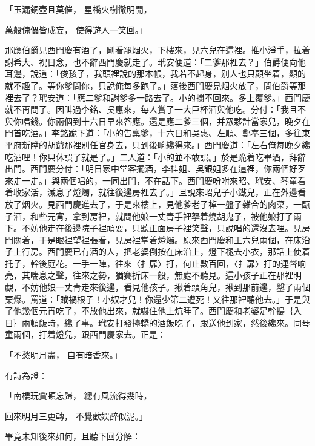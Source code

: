 「玉漏銅壺且莫催，  星橋火樹徹明開，

萬般傀儡皆成妄，  使得遊人一笑回。」

那應伯爵見西門慶有酒了，剛看罷烟火，下樓來，見六兒在這裡。推小淨手，拉着謝希大、祝日念，也不辭西門慶就走了。玳安便道：「二爹那裡去？」伯爵便向他耳邊，說道：「俊孩子，我頭裡說的那本帳，我若不起身，別人也只顧坐着，顯的就不趣了。等你爹問你，只說俺每多跑了。」落後西門慶見烟火放了，問伯爵等那裡去了？玳安道：「應二爹和謝爹多一路去了。小的攔不回來。多上覆爹。」西門慶就不再問了。因叫過李銘、吳惠來，每人賞了一大巨杯酒與他吃。分付：「我且不與你唱錢。你兩個到十六日早來答應。還是應二爹三個，并眾夥計當家兒，晚夕在門首吃酒。」李銘跪下道：「小的告稟爹，十六日和吳惠、左順、鄭奉三個，多往東平府新陞的胡爺那裡別任官身去，只到後晌纔得來。」西門慶道：「左右俺每晚夕纔吃酒哩！你只休誤了就是了。」二人道：「小的並不敢誤。」於是跪着吃畢酒，拜辭出門。西門慶分付：「明日家中堂客擺酒，李桂姐、吳銀姐多在這裡，你兩個好歹來走一走。」與兩個唱的，一同出門，不在話下。西門慶吩咐來昭、玳安、琴童看着收家活，滅息了燈燭，就往後邊房裡去了。」且說來昭兒子小鐵兒，正在外邊看放了烟火。見西門慶進去了，于是來樓上，見他爹老子棹一盤子雜合的肉菜，一甌子酒，和些元宵，拿到房裡，就問他娘一丈青手裡拏着燒胡鬼子，被他娘打了兩下。不妨他走在後邊院子裡頑耍，只聽正面房子裡笑聲，只說唱的還沒去哩。見房門關着，于是眼裡望裡張看，見房裡掌着燈燭。原來西門慶和王六兒兩個，在床沿子上行房。西門慶已有酒的人，把老婆倒按在床沿上，燈下褪去小衣，那話上使着托子，幹後庭花。一手一陣，往來〈扌扉〉打，何止數百回，〈扌扉〉打的連聲响亮，其喘息之聲，往來之勢，猶賽折床一般，無處不聽見。這小孩子正在那裡明覷，不妨他娘一丈青走來後邊，看見他孩子。揪着頭角兒，揪到那前邊，鑿了兩個栗爆。罵道：「賊禍根子！小奴才兒！你還少第二遭死！又往那裡聽他去。」于是與了他幾個元宵吃了，不放他出來，就嚇住他上炕睡了。西門慶和老婆足幹搗｛入日｝兩頓飯時，纔了事。玳安打發擡轎的酒飯吃了，跟送他到家，然後纔來。同琴童兩個，打着燈兒，跟西門慶家去。正是：

「不愁明月盡，  自有暗香來。」

有詩為證：

「南樓玩賞頓忘歸，  總有風流得幾時，

回來明月三更轉，  不覺歡娛醉似泥。」

畢竟未知後來如何，且聽下回分解：
